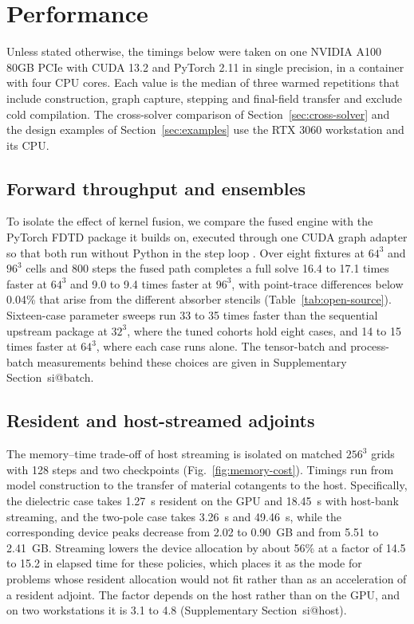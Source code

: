 \documentclass[preprint,11pt]{elsarticle}
\makeatletter
\newcommand{\suppsec}[1]{Supplementary Section~\csname si@#1\endcsname}
\makeatother
\begin{document}
\section{Performance}
\label{sec:performance}

Unless stated otherwise, the timings below were taken on one NVIDIA A100 80GB PCIe with CUDA 13.2 and PyTorch 2.11 in single precision, in a container with four CPU cores. Each value is the median of three warmed repetitions that include construction, graph capture, stepping and final-field transfer and exclude cold compilation. The cross-solver comparison of Section~\ref{sec:cross-solver} and the design examples of Section~\ref{sec:examples} use the RTX 3060 workstation and its CPU.

\subsection{Forward throughput and ensembles}

To isolate the effect of kernel fusion, we compare the fused engine with the PyTorch FDTD package it builds on, executed through one CUDA graph adapter so that both run without Python in the step loop \citep{fdtd}. Over eight fixtures at $64^{3}$ and $96^{3}$ cells and 800 steps the fused path completes a full solve 16.4 to 17.1 times faster at $64^{3}$ and 9.0 to 9.4 times faster at $96^{3}$, with point-trace differences below 0.04\% that arise from the different absorber stencils (Table~\ref{tab:open-source}). Sixteen-case parameter sweeps run 33 to 35 times faster than the sequential upstream package at $32^{3}$, where the tuned cohorts hold eight cases, and 14 to 15 times faster at $64^{3}$, where each case runs alone. The tensor-batch and process-batch measurements behind these choices are given in \suppsec{batch}.




\subsection{Resident and host-streamed adjoints}

The memory--time trade-off of host streaming is isolated on matched $256^3$ grids with 128 steps and two checkpoints (Fig.~\ref{fig:memory-cost}). Timings run from model construction to the transfer of material cotangents to the host. Specifically, the dielectric case takes 1.27~s resident on the GPU and 18.45~s with host-bank streaming, and the two-pole case takes 3.26~s and 49.46~s, while the corresponding device peaks decrease from 2.02 to 0.90~GB and from 5.51 to 2.41~GB. Streaming lowers the device allocation by about 56\% at a factor of 14.5 to 15.2 in elapsed time for these policies, which places it as the mode for problems whose resident allocation would not fit rather than as an acceleration of a resident adjoint. The factor depends on the host rather than on the GPU, and on two workstations it is 3.1 to 4.8 (\suppsec{host}).
\end{document}
